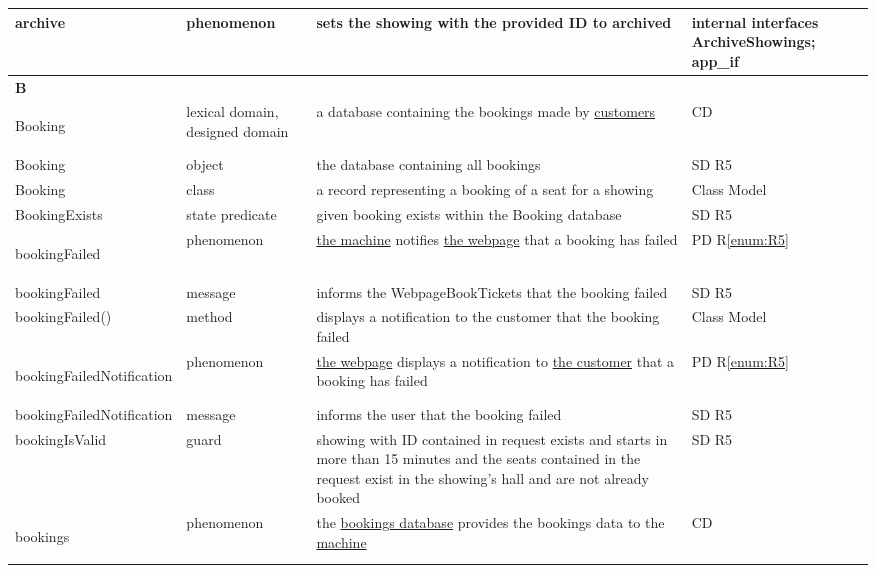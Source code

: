\documentclass[a4paper,10pt,titlepage,bibtotoc,bibtotocnumbered]{scrreprt}
\begin{document}
\begin{longtable}{|p{.4\linewidth}|p{.2\linewidth}|p{.2\linewidth}|p{.2\linewidth}|}
\hline
archive & phenomenon & sets the showing with the provided ID to archived & internal interfaces ArchiveShowings; app\_if\\
\hline
\multicolumn{4}{|l|}{\textbf{B}}\\
\hline
\hypertarget{glossary:Booking}{Booking} & lexical domain, designed domain & a database containing the bookings made by \hyperlink{glossary:Customer}{customers} & CD\\
\hline
Booking & object & the database containing all bookings & SD R5\\
\hline
Booking & class & a record representing a booking of a seat for a showing & Class Model\\
\hline
BookingExists & state predicate & given booking exists within the Booking database & SD R5\\
\hline
\hypertarget{glossary:bookingFailed}{bookingFailed} & phenomenon & \hyperlink{glossary:UDEKino}{the machine} notifies \hyperlink{glossary:WebpageBookTickets}{the webpage} that a booking has failed & PD R\ref{enum:R5}\\
\hline
bookingFailed & message & informs the WebpageBookTickets that the booking failed & SD R5\\
\hline
bookingFailed() & method & displays a notification to the customer that the booking failed & Class Model\\
\hline
\hypertarget{glossary:bookingFailedNotification}{bookingFailedNotification} & phenomenon & \hyperlink{glossary:WebpageBookTickets}{the webpage} displays a notification to \hyperlink{glossary:Customer}{the customer} that a booking has failed & PD R\ref{enum:R5}\\
\hline
bookingFailedNotification & message & informs the user that the booking failed & SD R5\\
\hline
bookingIsValid & guard & showing with ID contained in request exists and starts in more than 15 minutes and the seats contained in the request exist in the showing's hall and are not already booked & SD R5\\
\hline
\hypertarget{glossary:bookings}{bookings} & phenomenon & the \hyperlink{glossary:Booking}{bookings database} provides the bookings data to the \hyperlink{glossary:UDEKino}{machine} & CD\\

\end{longtable}
\end{document}
